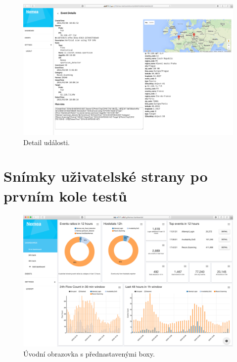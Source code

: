 \begin{figure}[ht]
    \centering
    \includegraphics[width=1\textwidth]{fig/screen_before_3.png}
    \caption{Detail události.} \label{screen:before:3}
\end{figure}



\chapter{Snímky uživatelské strany po prvním kole testů}
\label{screens:after}

\begin{figure}[ht]
    \centering
    \includegraphics[width=1\textwidth]{fig/screen_after_1.png}
    \caption{Úvodní obrazovka s přednastavenými boxy.} \label{screen:after:1}
\end{figure}

